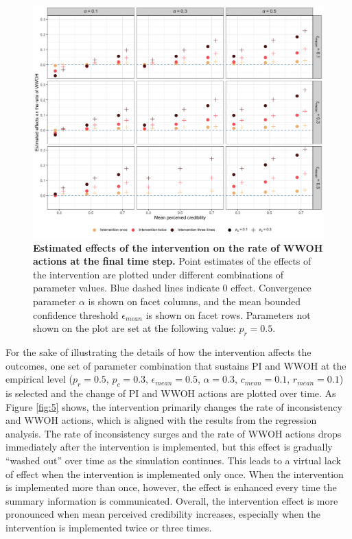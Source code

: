 \documentclass[
  11pt,
]{article}
\begin{document}
\begin{figure}[h]
  \centering
  \includegraphics[width=1\columnwidth]{./figures/intervention_effect_p_wwoh.png}
  \caption{\textbf{Estimated effects of the intervention on the rate of WWOH actions at the final time step.} Point estimates of the effects of the intervention are plotted under different combinations of parameter values. Blue dashed lines indicate 0 effect. Convergence parameter $\alpha$ is shown on facet columns, and the mean bounded confidence threshold $\epsilon_{mean}$ is shown on facet rows. Parameters not shown on the plot are set at the following value: $p_r = 0.5$.}
  \label{fig:4}
\end{figure}

For the sake of illustrating the details of how the intervention affects
the outcomes, one set of parameter combination that sustains PI and WWOH
at the empirical level (\(p_r = 0.5\), \(p_c = 0.3\),
\(\epsilon_{mean} = 0.5\), \(\alpha = 0.3\), \(c_{mean} = 0.1\),
\(r_{mean} = 0.1\)) is selected and the change of PI and WWOH actions
are plotted over time. As Figure \ref{fig:5} shows, the intervention
primarily changes the rate of inconsistency and WWOH actions, which is
aligned with the results from the regression analysis. The rate of
inconsistency surges and the rate of WWOH actions drops immediately
after the intervention is implemented, but this effect is gradually
``washed out'' over time as the simulation continues. This leads to a
virtual lack of effect when the intervention is implemented only once.
When the intervention is implemented more than once, however, the effect
is enhanced every time the summary information is communicated. Overall,
the intervention effect is more pronounced when mean perceived
credibility increases, especially when the intervention is implemented
twice or three times.
\end{document}
